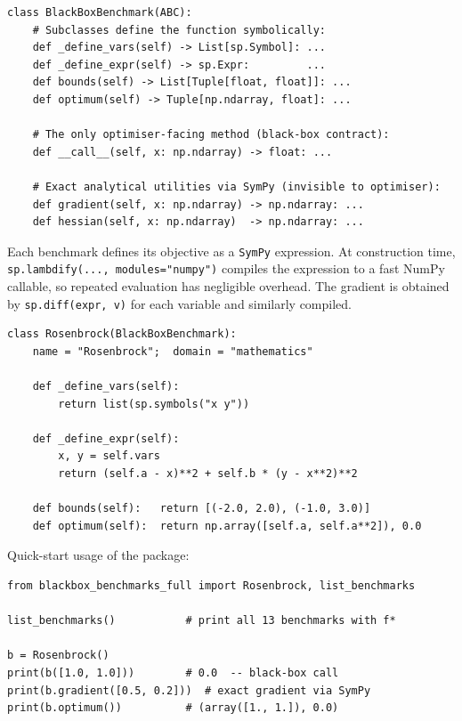 \begin{lstlisting}[caption={Abstract base class interface in
\texttt{blackbox\_benchmarks\_full.py}}, label={lst:base}]
class BlackBoxBenchmark(ABC):
    # Subclasses define the function symbolically:
    def _define_vars(self) -> List[sp.Symbol]: ...
    def _define_expr(self) -> sp.Expr:         ...
    def bounds(self) -> List[Tuple[float, float]]: ...
    def optimum(self) -> Tuple[np.ndarray, float]: ...

    # The only optimiser-facing method (black-box contract):
    def __call__(self, x: np.ndarray) -> float: ...

    # Exact analytical utilities via SymPy (invisible to optimiser):
    def gradient(self, x: np.ndarray) -> np.ndarray: ...
    def hessian(self, x: np.ndarray)  -> np.ndarray: ...
\end{lstlisting}

Each benchmark defines its objective as a \texttt{SymPy} expression.
At construction time, \texttt{sp.lambdify(..., modules="numpy")} compiles
the expression to a fast NumPy callable, so repeated evaluation has
negligible overhead. The gradient is obtained by
\texttt{sp.diff(expr,~v)} for each variable and similarly compiled.

\begin{lstlisting}[caption={Rosenbrock benchmark — full definition},
                   label={lst:rosenbrock}]
class Rosenbrock(BlackBoxBenchmark):
    name = "Rosenbrock";  domain = "mathematics"

    def _define_vars(self):
        return list(sp.symbols("x y"))

    def _define_expr(self):
        x, y = self.vars
        return (self.a - x)**2 + self.b * (y - x**2)**2

    def bounds(self):   return [(-2.0, 2.0), (-1.0, 3.0)]
    def optimum(self):  return np.array([self.a, self.a**2]), 0.0
\end{lstlisting}

Quick-start usage of the package:

\begin{lstlisting}[caption={Package usage example}, label={lst:usage}]
from blackbox_benchmarks_full import Rosenbrock, list_benchmarks

list_benchmarks()           # print all 13 benchmarks with f*

b = Rosenbrock()
print(b([1.0, 1.0]))        # 0.0  -- black-box call
print(b.gradient([0.5, 0.2]))  # exact gradient via SymPy
print(b.optimum())          # (array([1., 1.]), 0.0)
\end{lstlisting}

